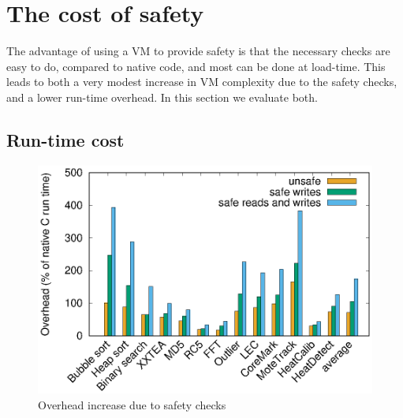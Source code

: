 

\section{The cost of safety}
\label{sec-evaluation-safety}

The advantage of using a VM to provide safety is that the necessary checks are easy to do, compared to native code, and most can be done at load-time. This leads to both a very modest increase in VM complexity due to the safety checks, and a lower run-time overhead. In this section we evaluate both.


\subsection{Run-time cost}
\label{sec-evaluation-run-time-cost}

\begin{figure}
\centering
\includegraphics[width=\mygraphsize]{safety-cost.eps}
\caption{Overhead increase due to safety checks}
\label{fig-safety-cost-per-benchmark}
\end{figure}

